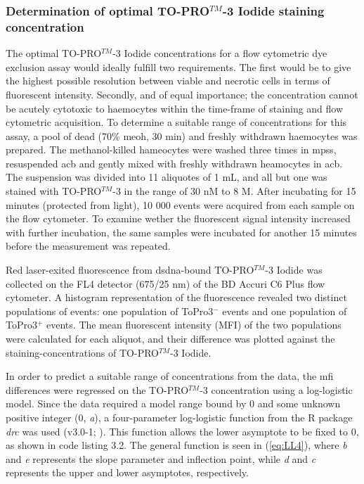 \subsubsection{Determination of optimal TO-PRO$^{TM}$-3 Iodide staining concentration}
The optimal TO-PRO$^{TM}$-3 Iodide concentrations for a flow cytometric dye exclusion assay would ideally fulfill two requirements. The first would be to give the highest possible resolution between viable and necrotic cells in terms of fluorescent intensity. Secondly, and of equal importance; the concentration cannot be acutely cytotoxic to haemocytes within the time-frame of staining and flow cytometric acquisition. To determine a suitable range of concentrations for this assay, a pool of dead (70\% \acrshort{meoh}, 30 min) and freshly withdrawn haemocytes was prepared. The methanol-killed hameocytes were washed three times in \acrshort{mpss}, resuspended \acrshort{acb} and gently mixed with freshly withdrawn heamocytes in \acrshort{acb}. The suspension was divided into 11 aliquotes of 1 mL, and all but one was stained with TO-PRO$^{TM}$-3 in the range of 30 nM to 8 \micro M. After incubating for 15 minutes (protected from light), 10 000 events were acquired from each sample on the flow cytometer. To examine wether the fluorescent signal intensity increased with further incubation, the same samples were incubated for another 15 minutes before the measurement was repeated.

Red laser-exited fluorescence from \acrshort{dsdna}-bound TO-PRO$^{TM}$-3 Iodide was collected on the FL4 detector (675/25 nm) of the BD Accuri C6 Plus flow cytometer. A histogram representation of the fluorescence revealed two distinct populations of events: one population of ToPro3$^{-}$ events and one population of ToPro3$^{+}$ events. The mean fluorescent intensity (MFI) of the two populations were calculated for each aliquot, and their difference was plotted against the staining-concentrations of TO-PRO$^{TM}$-3 Iodide.

In order to predict a suitable range of concentrations from the data, the \acrshort{mfi} differences were regressed on the TO-PRO$^{TM}$-3 concentration using a log-logistic model. Since the data required a model range bound by 0 and some unknown positive integer (0, \emph{a}), a four-parameter log-logistic function from the R package \emph{drc} was used (v3.0-1; \cite{drc}). This function allows the lower asymptote to be fixed to 0, as shown in code listing 3.2. The general function is seen in (\ref{eq:LL4}), where \emph{b} and \emph{e} represents the slope parameter and inflection point, while \emph{d} and \emph{c} represents the upper and lower asymptotes, respectively.

